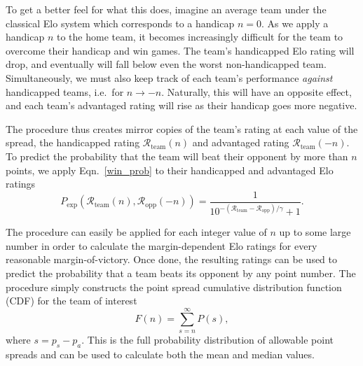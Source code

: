 \documentclass[aps,prc,reprint,amsmath,superscriptaddress]{revtex4-1}
\newcommand{\R}{\mathcal{R}}
\begin{document}
To get a better feel for what this does, imagine an average team under the classical Elo system which corresponds to a handicap $n=0$. 
As we apply a handicap $n$ to the home team, it becomes increasingly difficult for the team to overcome their handicap and win games.
The team's handicapped Elo rating will drop, and eventually will fall below even the worst non-handicapped team.
Simultaneously, we must also keep track of each team's performance \emph{against} handicapped teams, i.e.\ for $n \rightarrow -n$.
Naturally, this will have an opposite effect, and each team's advantaged rating will rise as their handicap goes more negative.

The procedure thus creates mirror copies of the team's rating at each value of the spread, the handicapped rating $\R_\text{team}(n)$ and advantaged rating $\R_\text{team}(-n)$.
To predict the probability that the team will beat their opponent by more than $n$ points, we apply Eqn.~\eqref{win_prob} to their handicapped and advantaged Elo ratings
\begin{equation}
  \label{win_prob_hcap}
  P_\text{exp}(\R_\text{team}(n), \R_\text{opp}(-n)) = \frac{1}{10^{-(\R_\text{team} - \R_\text{opp})/\gamma} + 1}.
\end{equation}

The procedure can easily be applied for each integer value of $n$ up to some large number in order to calculate the margin-dependent Elo ratings for every reasonable margin-of-victory.
Once done, the resulting ratings can be used to predict the probability that a team beats its opponent by any point number.
The procedure simply constructs the point spread cumulative distribution function (CDF) for the team of interest
\begin{equation}
  \label{cdf}
  F(n) = \sum_{s=n}^\infty P(s),
\end{equation}
where $s = p_s - p_a$.
This is the full probability distribution of allowable point spreads and can be used to calculate both the mean and median values.
\end{document}
